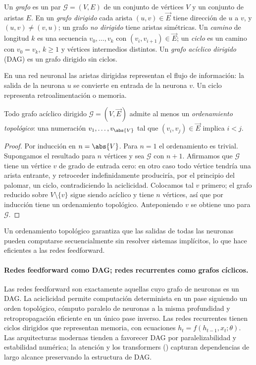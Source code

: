 \begin{definition}
\label{def:found:graph}
Un \emph{grafo} es un par $\mathcal{G} = (V, E)$ de un conjunto de v\'ertices $V$ y
un conjunto de aristas $E$. En un \emph{grafo dirigido} cada arista $(u,v) \in
\vec{E}$ tiene direcci\'on de $u$ a $v$, y $(u,v) \ne (v,u)$; un grafo \emph{no
dirigido} tiene aristas sim\'etricas. Un \emph{camino} de longitud $k$ es una
secuencia $v_0, \ldots, v_k$ con $(v_i, v_{i+1}) \in \vec{E}$; un \emph{ciclo} es
un camino con $v_0 = v_k$, $k \ge 1$ y v\'ertices intermedios distintos. Un
\emph{grafo ac\'iclico dirigido} (DAG) es un grafo dirigido sin ciclos.
\end{definition}

En una red neuronal las aristas dirigidas representan el flujo de informaci\'on: la
salida de la neurona $u$ se convierte en entrada de la neurona $v$. Un ciclo
representa retroalimentaci\'on o memoria.

\begin{theorem}
\label{thm:found:topological}
Todo grafo ac\'iclico dirigido $\mathcal{G} = (V, \vec{E})$ admite al menos un
\emph{ordenamiento topol\'ogico}: una numeraci\'on $v_1, \ldots, v_{\abs{V}}$ tal
que $(v_i, v_j) \in \vec{E}$ implica $i < j$.
\end{theorem}

\begin{proof}
Por inducci\'on en $n = \abs{V}$. Para $n = 1$ el ordenamiento es trivial.
Supongamos el resultado para $n$ v\'ertices y sea $\mathcal{G}$ con $n+1$.
Afirmamos que $\mathcal{G}$ tiene un v\'ertice $v$ de grado de entrada cero: en
otro caso todo v\'ertice tendr\'ia una arista entrante, y retroceder
indefinidamente producir\'ia, por el principio del palomar, un ciclo, contradiciendo
la aciclicidad. Colocamos tal $v$ primero; el grafo reducido sobre $V \setminus
\{v\}$ sigue siendo ac\'iclico y tiene $n$ v\'ertices, as\'i que por inducci\'on
tiene un ordenamiento topol\'ogico. Anteponiendo $v$ se obtiene uno para
$\mathcal{G}$.
\end{proof}

Un ordenamiento topol\'ogico garantiza que las salidas de todas las neuronas pueden
computarse secuencialmente sin resolver sistemas impl\'icitos, lo que hace
eficientes a las redes feedforward.

\paragraph{Redes feedforward como DAG; redes recurrentes como grafos c\'iclicos.}
Las redes feedforward son exactamente aquellas cuyo grafo de neuronas es un DAG. La
aciclicidad permite computaci\'on determinista en un pase siguiendo un orden
topol\'ogico, c\'omputo paralelo de neuronas a la misma profundidad y
retropropagaci\'on eficiente en un \'unico pase inverso. Las redes recurrentes
tienen ciclos dirigidos que representan memoria, con ecuaciones $h_t = f(h_{t-1},
x_t; \theta)$. Las arquitecturas modernas tienden a favorecer DAG por
paralelizabilidad y estabilidad num\'erica; la atenci\'on y los transformers
() capturan dependencias de largo alcance preservando la
estructura de DAG.


